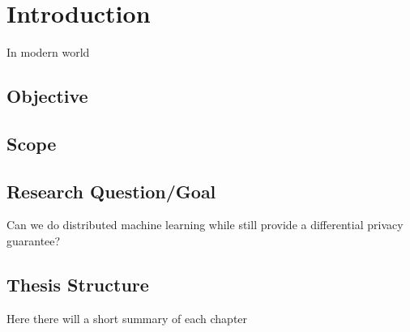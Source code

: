 
\chapter{Introduction}
In modern world

\section{Objective}

\section{Scope}

\section{Research Question/Goal}
Can we do distributed machine learning while still provide a differential privacy guarantee?


\section{Thesis Structure}
Here there will a short summary of each chapter



